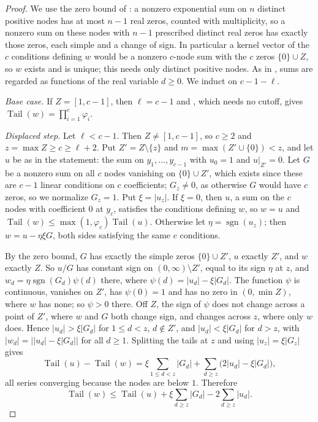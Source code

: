 \documentclass[11pt]{article}
\DeclareMathOperator{\Tail}{Tail}
\DeclareMathOperator{\sgn}{sgn}
\begin{document}
\begin{proof}
We use the zero bound of \cite[Section~2]{coefficient-mass}: a nonzero
exponential sum on $n$ distinct positive nodes has at most $n-1$ real
zeros, counted with multiplicity, so a nonzero sum on these nodes with
$n-1$ prescribed distinct real zeros has exactly those zeros, each simple
and a change of sign.  In particular a kernel vector of the $c$ conditions
defining $w$ would be a nonzero $c$-node sum with the $c$ zeros
$\{0\}\cup Z$, so $w$ exists and is unique; this needs only distinct
positive nodes.  As in \cite[Section~2]{coefficient-mass}, sums are
regarded as functions of the real variable $d\ge0$.  We induct on
$c-1-\ell$.

\emph{Base case.}  If $Z=[1,c-1]$, then $\ell=c-1$ and
\cite[Lemma~2.1]{coefficient-mass}, which needs no cutoff, gives
$\Tail(w)=\prod_{i=1}^c\varphi_i$.

\emph{Displaced step.}  Let $\ell<c-1$.  Then $Z\ne[1,c-1]$, so $c\ge2$ and
$z=\max Z\ge c\ge\ell+2$.  Put $Z'=Z\setminus\{z\}$ and
$m=\max(Z'\cup\{0\})<z$, and let $u$ be as in the statement:
the sum on $y_1,\ldots,y_{c-1}$ with $u_0=1$ and $u|_{Z'}=0$.  Let $G$ be a
nonzero sum on all $c$ nodes vanishing on $\{0\}\cup Z'$, which exists
since these are $c-1$ linear conditions on $c$ coefficients; $G_z\ne0$, as
otherwise $G$ would have $c$ zeros, so we normalize $G_z=1$.  Put
$\xi=|u_z|$.  If $\xi=0$, then $u$, a sum on the $c$ nodes with coefficient
$0$ at $y_c$, satisfies the conditions defining $w$, so $w=u$ and
$\Tail(w)\le\max(1,\varphi_c)\Tail(u)$.  Otherwise let $\eta=\sgn(u_z)$; then $w=u-\eta\xi G$,
both sides satisfying the same $c$ conditions.

By the zero bound, $G$ has exactly the simple zeros $\{0\}\cup Z'$, $u$
exactly $Z'$, and $w$ exactly $Z$.  So $u/G$ has constant sign on
$(0,\infty)\setminus Z'$, equal to its sign $\eta$ at $z$, and
$w_d=\eta\sgn(G_d)\psi(d)$ there, where $\psi(d)=|u_d|-\xi|G_d|$.  The
function $\psi$ is continuous, vanishes on $Z'$, has $\psi(0)=1$ and has no
zero in $(0,\min Z)$, where $w$ has none; so $\psi>0$ there.  Off $Z$, the
sign of $\psi$ does not change across a point of $Z'$, where $w$ and $G$
both change sign, and changes across $z$, where only $w$ does.  Hence
$|u_d|>\xi|G_d|$ for $1\le d<z$, $d\notin Z'$, and $|u_d|<\xi|G_d|$ for
$d>z$, with $|w_d|=\bigl||u_d|-\xi|G_d|\bigr|$ for all $d\ge1$.  Splitting
the tails at $z$ and using $|u_z|=\xi|G_z|$ gives
\[
  \Tail(u)-\Tail(w)=\xi\sum_{1\le d<z}|G_d|
  +\sum_{d\ge z}\bigl(2|u_d|-\xi|G_d|\bigr),
\]
all series converging because the nodes are below $1$.  Therefore
\begin{equation}\label{eq:tailsplit}
  \Tail(w)\le\Tail(u)+\xi\sum_{d\ge z}|G_d|-2\sum_{d\ge z}|u_d|.
\end{equation}


\end{proof}
\end{document}

